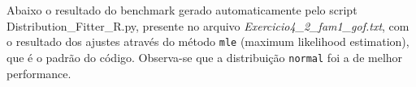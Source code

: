 \begin{figure}[ht!]
	\vspace{0mm}	%
	\begin{center}
	\end{center}
	\vspace{-2mm}	%
	\label{ex4_fig9}
\end{figure}

Abaixo o resultado do benchmark gerado automaticamente pelo script Distribution\_Fitter\_R.py, presente no arquivo \textit{Exercicio4\_2\_fam1\_gof.txt}, com o resultado dos ajustes através do método \texttt{mle} (maximum likelihood estimation), que é o padrão do código. Observa-se que a distribuição \texttt{normal} foi a de melhor performance.

